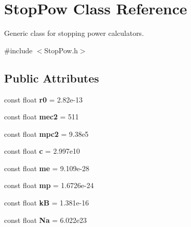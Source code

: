 \hypertarget{class_stop_pow}{\section{Stop\-Pow Class Reference}
\label{class_stop_pow}
}


Generic class for stopping power calculators.  




{\ttfamily \#include $<$Stop\-Pow.\-h$>$}

\subsection*{Public Attributes}
\begin{DoxyCompactItemize}
\item 
\hypertarget{class_stop_pow_a4e2afefafa73a108e367fa714755381a}{const float {\bfseries r0} = 2.\-82e-\/13}\label{class_stop_pow_a4e2afefafa73a108e367fa714755381a}

\item 
\hypertarget{class_stop_pow_a6630f7ecd7d886942178a1d3af07f31b}{const float {\bfseries mec2} = 511}\label{class_stop_pow_a6630f7ecd7d886942178a1d3af07f31b}

\item 
\hypertarget{class_stop_pow_a0bb93119a3657139e678bc0822083974}{const float {\bfseries mpc2} = 9.\-38e5}\label{class_stop_pow_a0bb93119a3657139e678bc0822083974}

\item 
\hypertarget{class_stop_pow_a7ca51e59ba5b8c43a5d969d5b7de1252}{const float {\bfseries c} = 2.\-997e10}\label{class_stop_pow_a7ca51e59ba5b8c43a5d969d5b7de1252}

\item 
\hypertarget{class_stop_pow_ad41f4bc6a9c44c061d07cc60099a99ae}{const float {\bfseries me} = 9.\-109e-\/28}\label{class_stop_pow_ad41f4bc6a9c44c061d07cc60099a99ae}

\item 
\hypertarget{class_stop_pow_aa20c3324505518394c9f182c5df73f8e}{const float {\bfseries mp} = 1.\-6726e-\/24}\label{class_stop_pow_aa20c3324505518394c9f182c5df73f8e}

\item 
\hypertarget{class_stop_pow_a3dc35c0a9d9da229547a1dc05fb5e9cb}{const float {\bfseries k\-B} = 1.\-381e-\/16}\label{class_stop_pow_a3dc35c0a9d9da229547a1dc05fb5e9cb}

\item 
\hypertarget{class_stop_pow_a313a7e44f18ec720ee555b8cc945eaf5}{const float {\bfseries Na} = 6.\-022e23}\label{class_stop_pow_a313a7e44f18ec720ee555b8cc945eaf5}


\end{DoxyCompactItemize}
